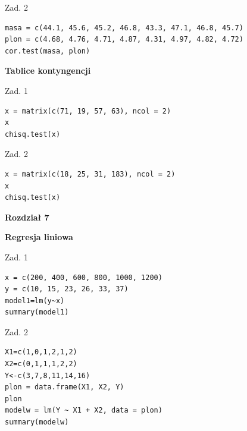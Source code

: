 \documentclass[12pt,B5paper,]{book}
\begin{document}
Zad. 2

\begin{verbatim}
masa = c(44.1, 45.6, 45.2, 46.8, 43.3, 47.1, 46.8, 45.7)
plon = c(4.68, 4.76, 4.71, 4.87, 4.31, 4.97, 4.82, 4.72)
cor.test(masa, plon)
\end{verbatim}

\vspace{0.8cm} \textbf{Tablice kontyngencji}

Zad. 1

\begin{verbatim}
x = matrix(c(71, 19, 57, 63), ncol = 2)
x
chisq.test(x)
\end{verbatim}

Zad. 2

\begin{verbatim}
x = matrix(c(18, 25, 31, 183), ncol = 2)
x
chisq.test(x)
\end{verbatim}

\newpage

\textbf{Rozdział 7}

\textbf{Regresja liniowa}

Zad. 1

\begin{verbatim}
x = c(200, 400, 600, 800, 1000, 1200)
y = c(10, 15, 23, 26, 33, 37)
model1=lm(y~x)
summary(model1)
\end{verbatim}

Zad. 2

\begin{verbatim}
X1=c(1,0,1,2,1,2)
X2=c(0,1,1,1,2,2)
Y<-c(3,7,8,11,14,16)
plon = data.frame(X1, X2, Y)
plon
modelw = lm(Y ~ X1 + X2, data = plon)
summary(modelw)
\end{verbatim}


\end{document}
